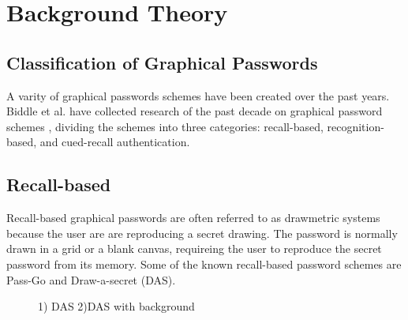 \section{Background Theory}

	\subsection{Classification of Graphical Passwords}

    A varity of graphical passwords schemes have been created over the past years. Biddle et al. have collected research 
    of the past decade on graphical password schemes \cite{Biddle}, dividing the schemes into three categories: recall-based, 
    recognition-based, and cued-recall authentication. 

    \subsection*{Recall-based}
      Recall-based graphical passwords are often referred to as drawmetric systems \cite{DeAngeli} because the user are
      are reproducing a secret drawing. The password is normally drawn in a grid or a blank canvas, requireing the
      user to reproduce the secret password from its memory.
      Some of the known recall-based password schemes are Pass-Go and Draw-a-secret (DAS).

      \begin{figure}[H]
        \centering
        \caption{1) DAS 2)DAS with background}
      \end{figure}

